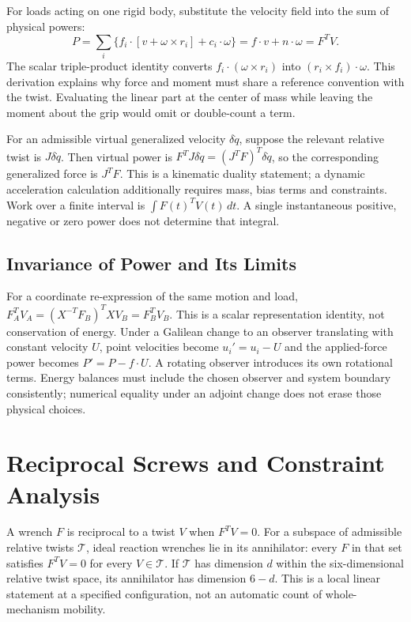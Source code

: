 For loads acting on one rigid body, substitute the velocity field into the sum of physical powers:
\begin{equation}
 P=\sum_i\{f_i\cdot[v+\omega\times r_i]+c_i\cdot\omega\}
 =f\cdot v+n\cdot\omega=F^TV.
\end{equation}
\label{eq:power}
\label{eq:wrench_twist_power}
\label{eq:wrench_twist_pairing}
The scalar triple-product identity converts $f_i\cdot(\omega\times r_i)$ into $(r_i\times f_i)\cdot\omega$. This derivation explains why force and moment must share a reference convention with the twist. Evaluating the linear part at the center of mass while leaving the moment about the grip would omit or double-count a term.

For an admissible virtual generalized velocity $\delta\dot q$, suppose the relevant relative twist is $J\delta\dot q$. Then virtual power is $F^TJ\delta\dot q=(J^TF)^T\delta\dot q$, so the corresponding generalized force is $J^TF$. This is a kinematic duality statement; a dynamic acceleration calculation additionally requires mass, bias terms and constraints. Work over a finite interval is $\int F(t)^TV(t)\,dt$. A single instantaneous positive, negative or zero power does not determine that integral.

\subsection{Invariance of Power and Its Limits}

For a coordinate re-expression of the same motion and load, $F_A^TV_A=(X^{-T}F_B)^TXV_B=F_B^TV_B$. This is a scalar representation identity, not conservation of energy. Under a Galilean change to an observer translating with constant velocity $U$, point velocities become $u_i'=u_i-U$ and the applied-force power becomes $P'=P-f\cdot U$. A rotating observer introduces its own rotational terms. Energy balances must include the chosen observer and system boundary consistently; numerical equality under an adjoint change does not erase those physical choices.

\section{Reciprocal Screws and Constraint Analysis}
\label{sec:reciprocal_screws}
\label{princ:constraint_principle}
\label{def:reciprocal_screws}

A wrench $F$ is reciprocal to a twist $V$ when $F^TV=0$. For a subspace of admissible relative twists $\mathcal T$, ideal reaction wrenches lie in its annihilator: every $F$ in that set satisfies $F^TV=0$ for every $V\in\mathcal T$. If $\mathcal T$ has dimension $d$ within the six-dimensional relative twist space, its annihilator has dimension $6-d$. This is a local linear statement at a specified configuration, not an automatic count of whole-mechanism mobility.

